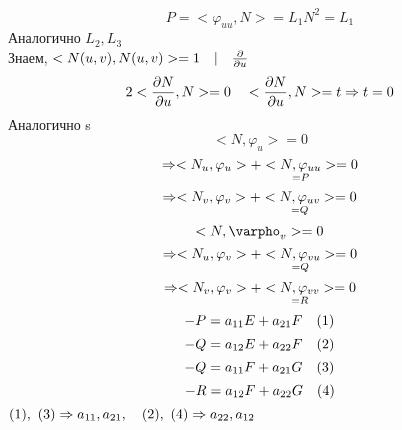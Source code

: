\documentclass[main]{subfiles}
\begin{document}
    \begin{Sol}
      \[P = <\varphi_{uu}, N> = L_1 N^2 = L_1\]
      Аналогично $L_2, L_3$\\
      Знаем, $<N(u,v),N(u,v)> = 1 \quad | \quad \frac{\partial}{\partial u}$
      \[2 <\frac{\partial N}{\partial u}, N> = 0 \quad <\frac{\partial N}{\partial u}, N> = t \Rightarrow t = 0\]
      Аналогично s
      \[<N, \varphi_u> = 0\]
      \[\Rightarrow <N_u, \varphi_u> + \underset{=P}{<N, \varphi_{uu}>} = 0\]
      \[\Rightarrow <N_v, \varphi_v> + \underset{=Q}{<N, \varphi_{uv}>} = 0\]
      \[<N, \varpho_v> = 0\]
      \[\Rightarrow <N_u, \varphi_v> + \underset{=Q}{<N, \varphi_{vu}>} = 0\]
      \[\Rightarrow <N_v, \varphi_v> + \underset{=R}{<N, \varphi_{vv}>} = 0\]
      \[-P = a_{11} E + a_{21} F \quad (1)\]
      \[-Q = a_{12} E + a_{22} F \quad (2)\]
      \[-Q = a_{11} F + a_{21} G \quad (3)\]
      \[-R = a_{12} F + a_{22} G \quad (4)\]
      $(1),\ (3) \Rightarrow a_{11}, a_{21},\quad (2),\ (4) \Rightarrow a_{22}, a_{12}$
    \end{Sol}
\end{document}
